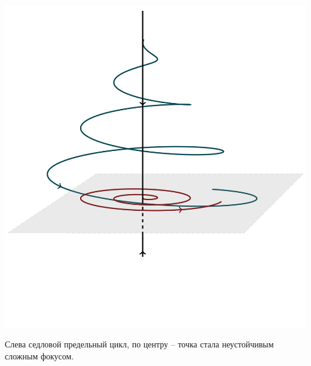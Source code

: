 \begin{center}
\begin{minipage}{0.3\linewidth}
        \vspace{-50pt}
        \label{fig:1}
    \end{minipage}
\hfill     
    \begin{minipage}{0.3\linewidth}
        \includegraphics[width=\linewidth]{fig/fig59.jpg} 
        \vspace{-50pt}
        \label{fig:1}
    \end{minipage}    
\end{center}

Слева седловой предельный цикл, по центру -- точка стала неустойчивым сложным фокусом.

